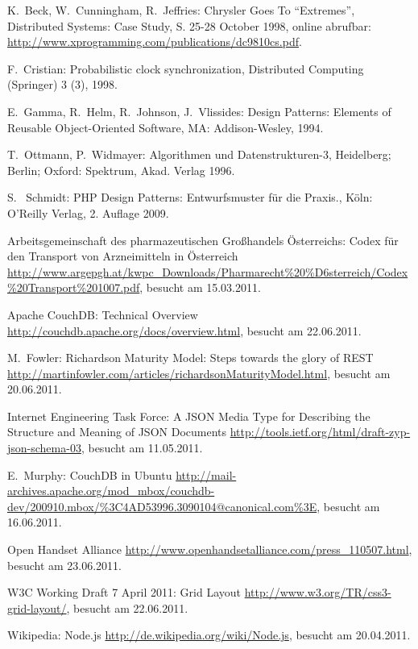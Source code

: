\begin{thebibliography}{99}

	K.\ Beck, W.\ Cunningham, R.\ Jeffries:
	Chrysler Goes To ``Extremes'',
	Distributed Systems: Case Study, S. 25-28 October 1998,
	online abrufbar: \url{http://www.xprogramming.com/publications/dc9810cs.pdf}.

	F.\ Cristian:
	Probabilistic clock synchronization,
	Distributed Computing (Springer) 3 (3), 1998.

  E.\ Gamma, R.\ Helm, R.\ Johnson, J.\ Vlissides:
    Design Patterns: Elements of Reusable Object-Oriented Software,
	MA: Addison-Wesley, 1994.
	
  T.\ Ottmann, P.\ Widmayer:
	Algorithmen und Datenstrukturen-3,
	Heidelberg; Berlin; Oxford: Spektrum, Akad. Verlag 1996.

  S. \ Schmidt:
	PHP Design Patterns: Entwurfsmuster für die Praxis.,
	Köln: O'Reilly Verlag, 2. Auflage 2009.


\hspace{-\leftmargin}{\Large\bfseries Web-Referenzen} %

	Arbeitsgemeinschaft des pharmazeutischen Großhandels Österreichs:
	Codex für den Transport von Arzneimitteln in Österreich
	\url{http://www.argepgh.at/kwpc_Downloads/Pharmarecht%20%D6sterreich/Codex%20Transport%201007.pdf},
	besucht am 15.03.2011.

	Apache CouchDB:
	Technical Overview
	\url{http://couchdb.apache.org/docs/overview.html},
	besucht am 22.06.2011.

	M.\ Fowler:
	Richardson Maturity Model: Steps towards the glory of REST
	\url{http://martinfowler.com/articles/richardsonMaturityModel.html},
	besucht am 20.06.2011.
	
	Internet Engineering Task Force:
	A JSON Media Type for Describing the Structure and Meaning of JSON Documents
	\url{http://tools.ietf.org/html/draft-zyp-json-schema-03},
	besucht am 11.05.2011.

	E.\ Murphy:
	CouchDB in Ubuntu
	\url{http://mail-archives.apache.org/mod_mbox/couchdb-dev/200910.mbox/%3C4AD53996.3090104@canonical.com%3E}, besucht am 16.06.2011.

  Open Handset Alliance
    \url{http://www.openhandsetalliance.com/press_110507.html}, besucht am 23.06.2011.


	W3C Working Draft 7 April 2011:
	Grid Layout
	\url{http://www.w3.org/TR/css3-grid-layout/}, besucht am 22.06.2011.

  Wikipedia: Node.js
    \url{http://de.wikipedia.org/wiki/Node.js}, besucht am 20.04.2011.
	
\end{thebibliography}